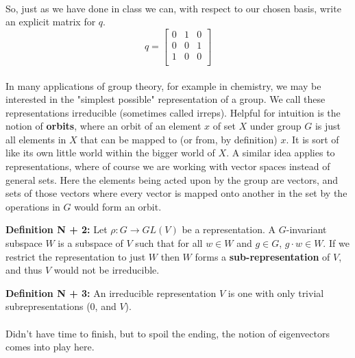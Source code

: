 \documentclass[twoside]{article}
\begin{document}
\paragraph*{} So, just as we have done in class we can, with respect to our chosen basis, write an explicit matrix for $q$.
\[
q = 
\begin{bmatrix}
0 & 1 & 0 \\ 
0 & 0 & 1 \\
1 & 0 & 0 \\
\end{bmatrix}
\]
\paragraph*{}  In many applications of group theory, for example in chemistry, we may 
be interested in the "simplest possible" representation of a group. We call these 
representations irreducible (sometimes called irreps). Helpful for intuition is the 
notion of \textbf{orbits}, where an orbit of an element $x$ of set $X$ under group $G$ is 
just all elements in $X$ that can be mapped to (or from, by definition) $x$. It is sort of 
like its own little world within the bigger world of $X$. A similar idea applies to 
representations, where of course we are working with vector spaces instead of general 
sets. Here the elements being acted upon by the group are vectors, and sets of those 
vectors where every vector is mapped onto another in the set by the operations in $G$
would form an orbit. 

\textbf{Definition N + 2:} Let $\rho: G \rightarrow GL(V)$ be a representation. A 
$G$-invariant subspace $W$ is a subspace of $V$ such that for all $w \in W$ and 
$g \in G$, $g \cdot w \in W$. If we restrict the representation to just $W$ then 
$W$ forms a \textbf{sub-representation} of $V$, and thus $V$ would not be irreducible.

\textbf{Definition N + 3:} An irreducible representation $V$ is one with only trivial 
subrepresentations (0, and $V$). 

\paragraph*{}  Didn't have time to finish, but to spoil the ending, the notion 
of eigenvectors comes into play here.

\newpage
\nocite{*}
\printbibliography
\end{document}
